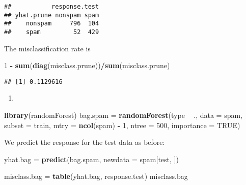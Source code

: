 \documentclass[]{article}
\newenvironment{Shaded}{\begin{snugshade}}{\end{snugshade}}
\newcommand{\DataTypeTok}[1]{\textcolor[rgb]{0.13,0.29,0.53}{#1}}
\newcommand{\DecValTok}[1]{\textcolor[rgb]{0.00,0.00,0.81}{#1}}
\newcommand{\KeywordTok}[1]{\textcolor[rgb]{0.13,0.29,0.53}{\textbf{#1}}}
\newcommand{\NormalTok}[1]{#1}
\newcommand{\OperatorTok}[1]{\textcolor[rgb]{0.81,0.36,0.00}{\textbf{#1}}}
\newcommand{\OtherTok}[1]{\textcolor[rgb]{0.56,0.35,0.01}{#1}}
\newcommand{\StringTok}[1]{\textcolor[rgb]{0.31,0.60,0.02}{#1}}
\begin{document}
\begin{verbatim}
##           response.test
## yhat.prune nonspam spam
##    nonspam     796  104
##    spam         52  429
\end{verbatim}

The misclassification rate is

\begin{Shaded}
\begin{Highlighting}[]
\DecValTok{1} \OperatorTok{-}\StringTok{ }\KeywordTok{sum}\NormalTok{(}\KeywordTok{diag}\NormalTok{(misclass.prune))}\OperatorTok{/}\KeywordTok{sum}\NormalTok{(misclass.prune)}
\end{Highlighting}
\end{Shaded}

\begin{verbatim}
## [1] 0.1129616
\end{verbatim}

\begin{enumerate}
\def\labelenumi{\alph{enumi})}
\setcounter{enumi}{5}
\item
\end{enumerate}

\begin{Shaded}
\begin{Highlighting}[]
\KeywordTok{library}\NormalTok{(randomForest)}
\NormalTok{bag.spam =}\StringTok{ }\KeywordTok{randomForest}\NormalTok{(type }\OperatorTok{~}\StringTok{ }\NormalTok{., }\DataTypeTok{data =}\NormalTok{ spam, }\DataTypeTok{subset =}\NormalTok{ train, }\DataTypeTok{mtry =} \KeywordTok{ncol}\NormalTok{(spam) }\OperatorTok{-}\StringTok{ }
\StringTok{    }\DecValTok{1}\NormalTok{, }\DataTypeTok{ntree =} \DecValTok{500}\NormalTok{, }\DataTypeTok{importance =} \OtherTok{TRUE}\NormalTok{)}
\end{Highlighting}
\end{Shaded}

We predict the response for the test data as before:

\begin{Shaded}
\begin{Highlighting}[]
\NormalTok{yhat.bag =}\StringTok{ }\KeywordTok{predict}\NormalTok{(bag.spam, }\DataTypeTok{newdata =}\NormalTok{ spam[test, ])}

\NormalTok{misclass.bag =}\StringTok{ }\KeywordTok{table}\NormalTok{(yhat.bag, response.test)}
\NormalTok{misclass.bag}
\end{Highlighting}
\end{Shaded}
\end{document}
